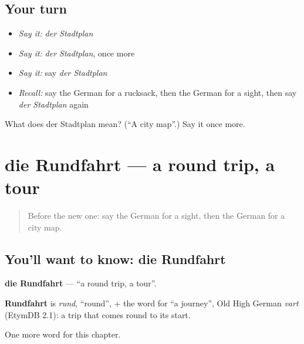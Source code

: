\subsection*{Your turn}
\begin{itemize}
\raggedright
  \item \emph{Say it:} \emph{der Stadtplan}
  \item \emph{Say it:} \emph{der Stadtplan}, once more
  \item \emph{Say it:} say \emph{der Stadtplan}
  \item \emph{Recall:} say the German for a rucksack, then the German for a sight, then say \emph{der Stadtplan} again
\end{itemize}

\begin{tcolorbox}[breakable,colback=teal!4,colframe=teal!35!black,title={Before you move on}]
What does der Stadtplan mean? (\textquotedblleft{}A city map\textquotedblright{}.) Say it once more.
\end{tcolorbox}
\section[die Rundfahrt]{die Rundfahrt — a round trip, a tour}

\label{lesson:GE-C194-rundfahrt}



\begin{quote}
Before the new one: say the German for a sight, then the German for a city map.
\end{quote}

\subsection*{You'll want to know: die Rundfahrt}
\textbf{die Rundfahrt} — \textquotedblleft{}a round trip, a tour\textquotedblright{}.

\begin{cousinweb}
\textbf{Rundfahrt} is \emph{rund}, \textquotedblleft{}round\textquotedblright{}, + the word for \textquotedblleft{}a journey\textquotedblright{}, Old High German \emph{vart} (EtymDB 2.1): a trip that comes round to its start.
\end{cousinweb}

\begin{grammarlens}[title={What you've built}]
One more word for this chapter.
\end{grammarlens}

